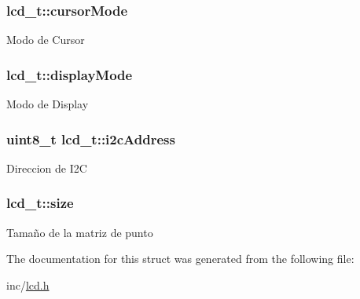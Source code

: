 \subsubsection[{\texorpdfstring{cursor\+Mode}{cursorMode}}]{ lcd\+\_\+t\+::cursor\+Mode}\hypertarget{structlcd__t_af835e6807732a6fe1c72731424a5a521}{}\label{structlcd__t_af835e6807732a6fe1c72731424a5a521}
Modo de Cursor 
\subsubsection[{\texorpdfstring{display\+Mode}{displayMode}}]{ lcd\+\_\+t\+::display\+Mode}\hypertarget{structlcd__t_a4b3326dee6a48438d03bb7f00f1eb23d}{}\label{structlcd__t_a4b3326dee6a48438d03bb7f00f1eb23d}
Modo de Display 
\subsubsection[{\texorpdfstring{i2c\+Address}{i2cAddress}}]{\setlength{\rightskip}{0pt plus 5cm}uint8\+\_\+t lcd\+\_\+t\+::i2c\+Address}\hypertarget{structlcd__t_a7c46fdbf5e02f1e7794b9a95c2ee6256}{}\label{structlcd__t_a7c46fdbf5e02f1e7794b9a95c2ee6256}
Direccion de I2C 
\subsubsection[{\texorpdfstring{size}{size}}]{ lcd\+\_\+t\+::size}\hypertarget{structlcd__t_a1c8cb84dd86cbadd6d2501527bfd036b}{}\label{structlcd__t_a1c8cb84dd86cbadd6d2501527bfd036b}
Tamaño de la matriz de punto 

The documentation for this struct was generated from the following file\+:\begin{DoxyCompactItemize}
\item 
inc/\hyperlink{lcd_8h}{lcd.\+h}\end{DoxyCompactItemize}
